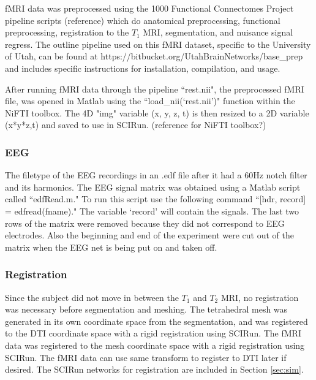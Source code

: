 fMRI data was preprocessed using the 1000 Functional Connectomes Project pipeline scripts (reference) which do anatomical preprocessing, functional preprocessing, registration to the $T_1$ MRI, segmentation, and nuisance signal regress. The outline pipeline used on this fMRI dataset, specific to the University of Utah, can be found at https://bitbucket.org/UtahBrainNetworks/base\_prep and includes specific instructions for installation, compilation, and usage.  

After running fMRI data through the pipeline ``rest.nii", the preprocessed fMRI file, was opened in Matlab using the ``load\_nii(`rest.nii')" function within the NiFTI toolbox. The 4D "img" variable (x, y, z, t) is then resized to a 2D variable (x*y*z,t) and saved to use in SCIRun. (reference for NiFTI toolbox?)

\subsubsection{EEG}

The filetype of the EEG recordings in an .edf file after it had a 60Hz notch filter and its harmonics. The EEG signal matrix was obtained using a Matlab script called ``edfRead.m." To run this script use the following command ``[hdr, record] = edfread(fname)." The variable `record' will contain the signals. The last two rows of the matrix were removed because they did not correspond to EEG electrodes. Also the beginning and end of the experiment were cut out of the matrix when the EEG net is being put on and taken off. 

\subsubsection{Registration}

Since the subject did not move in between the $T_1$ and $T_2$ MRI, no registration was necessary before segmentation and meshing. The tetrahedral mesh was generated in its own coordinate space from the segmentation, and was registered to the DTI coordinate space with a rigid registration using SCIRun. The fMRI data was registered to the mesh coordinate space with a rigid registration using SCIRun. The fMRI data can use same transform to register to DTI later if desired. The SCIRun networks for registration are included in Section \ref{sec:sim}.

